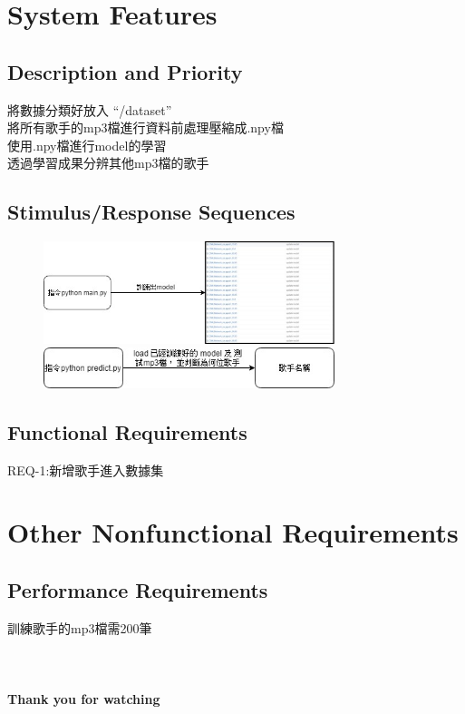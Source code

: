 \documentclass{article}
\begin{document}
\begin{CJK}{UTF8}{bkai}
\newpage



\section{\huge\bf \color{blue}  System Features }
\subsection{\Large Description and Priority }
	將數據分類好放入 “/dataset”\\
	將所有歌手的mp3檔進行資料前處理壓縮成.npy檔\\
	使用.npy檔進行model的學習\\
	透過學習成果分辨其他mp3檔的歌手\\


\subsection{\Large Stimulus/Response Sequences}
\begin{figure}[h]
\begin{center}
\includegraphics[width=8.5cm]{sti.jpg}
\newline
\newline
\newline
\includegraphics[width=8.5cm]{ss.jpg}
\end{center}
\label{fig:1}
\end{figure}

\subsection{ \Large Functional Requirements}
 REQ-1:新增歌手進入數據集


\section{\huge\bf  \color {blue}  Other Nonfunctional Requirements }
\subsection{ \Large Performance Requirements}
訓練歌手的mp3檔需200筆\\\\\\\\
\Huge\bf   Thank you for watching


\end{CJK}
\end{document}
